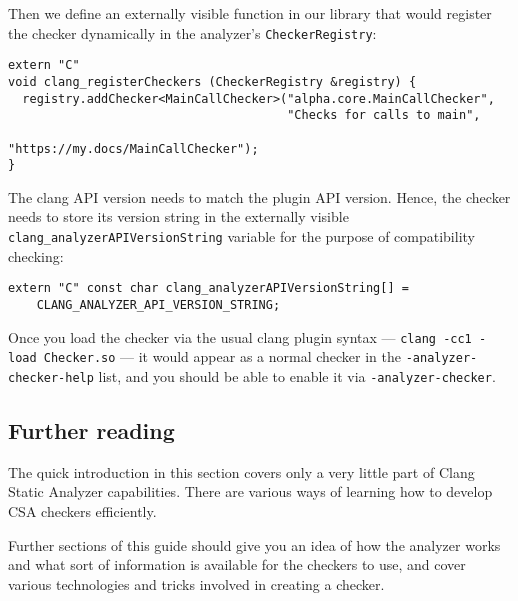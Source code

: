 \documentclass[a4paper,12pt]{article}
\newenvironment{nobr}{\begin{minipage}{\textwidth}\setlength\parskip{1em}
}{\end{minipage}\ignorespacesafterend}
\begin{document}
\begin{nobr}
Then we define an externally visible function in our library that would register the checker dynamically in the analyzer's \lstinline|CheckerRegistry|:

\begin{lstlisting}[style=cplusplus,numbers=none]
extern "C"
void clang_registerCheckers (CheckerRegistry &registry) {
  registry.addChecker<MainCallChecker>("alpha.core.MainCallChecker",
                                       "Checks for calls to main",
                                       "https://my.docs/MainCallChecker");
}
\end{lstlisting}
\end{nobr}

\begin{nobr}
The clang API version needs to match the plugin API version. Hence, the checker needs to store its version string in the externally visible \lstinline|clang_analyzerAPIVersionString| variable for the purpose of compatibility checking:

\begin{lstlisting}[style=cplusplus,numbers=none]
extern "C" const char clang_analyzerAPIVersionString[] =
    CLANG_ANALYZER_API_VERSION_STRING;
\end{lstlisting}
\end{nobr}

Once you load the checker via the usual clang plugin syntax --- \lstinline|clang -cc1 -load Checker.so| --- it would appear as a normal checker in the \lstinline|-analyzer-checker-help| list, and you should be able to enable it via \lstinline|-analyzer-checker|.


\subsection{Further reading}

The quick introduction in this section covers only a very little part of Clang Static Analyzer capabilities. There are various ways of learning how to develop CSA checkers efficiently.

Further sections of this guide should give you an idea of how the analyzer works and what sort of information is available for the checkers to use, and cover various technologies and tricks involved in creating a checker.
\end{document}
